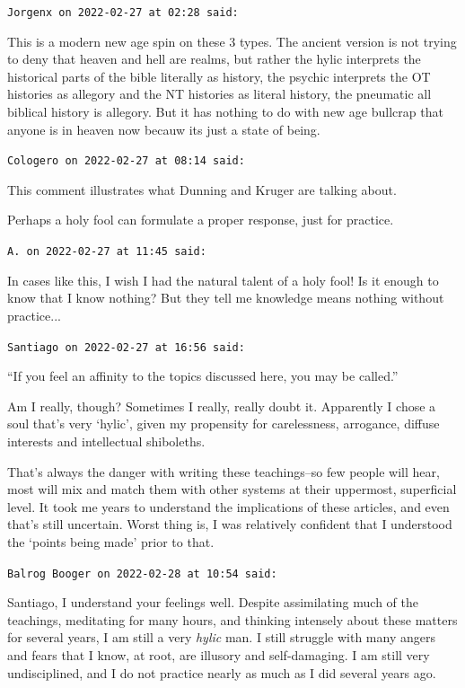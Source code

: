 \begin{footnotesize}
\begin{sffamily}
\texttt{Jorgenx on 2022-02-27 at 02:28 said:}

This is a modern new age spin on these 3 types. The ancient version is not trying to deny that heaven and hell are realms, but rather the hylic interprets the historical parts of the bible literally as history, the psychic interprets the OT histories as allegory and the NT histories as literal history, the pneumatic all biblical history is allegory. But it has nothing to do with new age bullcrap that anyone is in heaven now becauw its just a state of being.

\hfill

\texttt{Cologero on 2022-02-27 at 08:14 said:}

This comment illustrates what Dunning and Kruger are talking about.

Perhaps a holy fool can formulate a proper response, just for practice.

\hfill

\texttt{A. on 2022-02-27 at 11:45 said:}

In cases like this, I wish I had the natural talent of a holy fool! Is it enough to know that I know nothing? But they tell me knowledge means nothing without practice... 

\hfill

\texttt{Santiago on 2022-02-27 at 16:56 said:}

``If you feel an affinity to the topics discussed here, you may be called.''

Am I really, though? Sometimes I really, really doubt it. Apparently I chose a soul that's very `hylic', given my propensity for carelessness, arrogance, diffuse interests and intellectual shiboleths.

That's always the danger with writing these teachings--so few people will hear, most will mix and match them with other systems at their uppermost, superficial level. It took me years to understand the implications of these articles, and even that's still uncertain. Worst thing is, I was relatively confident that I understood the `points being made' prior to that.

\hfill

\texttt{Balrog Booger on 2022-02-28 at 10:54 said:}

Santiago, I understand your feelings well. Despite assimilating much of the teachings, meditating for many hours, and thinking intensely about these matters for several years, I am still a very \emph{hylic} man. I still struggle with many angers and fears that I know, at root, are illusory and self-damaging. I am still very undisciplined, and I do not practice nearly as much as I did several years ago.


\end{sffamily}
\end{footnotesize}
